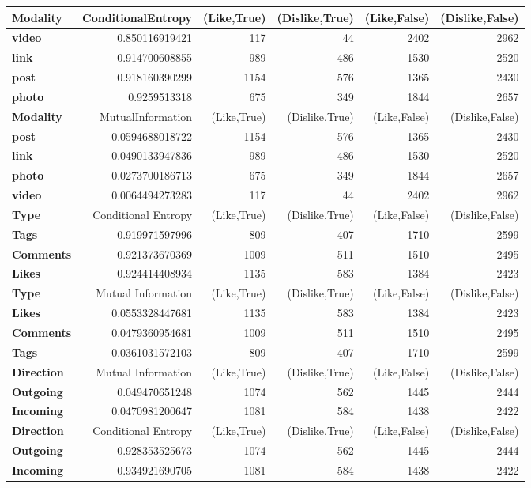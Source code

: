 \cleardoublepage
\begin{table}
	\centering
	\begin{tabular}{| >{\small}l | >{\small}r | >{\small}r | >{\small}r | >{\small}r | >{\small}r |}
		\hline
		Modality & ConditionalEntropy & (Like,True) & (Dislike,True) & (Like,False) & (Dislike,False)\\
		\hline
		\textbf{video} & 0.850116919421 & 117 & 44 & 2402 & 2962\\
		\hline
		\textbf{link} & 0.914700608855 & 989 & 486 & 1530 & 2520\\
		\hline
		\textbf{post} & 0.918160390299 & 1154 & 576 & 1365 & 2430\\
		\hline
		\textbf{photo} & 0.9259513318 & 675 & 349 & 1844 & 2657\\
		\hline
		\hline
		\textbf{Modality} & MutualInformation & (Like,True) & (Dislike,True) & (Like,False) & (Dislike,False)\\
		\hline
		\textbf{post} & 0.0594688018722 & 1154 & 576 & 1365 & 2430\\
		\hline
		\textbf{link} & 0.0490133947836 & 989 & 486 & 1530 & 2520\\
		\hline
		\textbf{photo} & 0.0273700186713 & 675 & 349 & 1844 & 2657\\
		\hline
		\textbf{video} & 0.0064494273283 & 117 & 44 & 2402 & 2962\\
		\hline
		\hline
		\textbf{Type}  & Conditional Entropy & (Like,True) & (Dislike,True) & (Like,False) & (Dislike,False)\\
		\hline
		\textbf{Tags}  &  0.919971597996 & 809 & 407 & 1710 & 2599\\
		\hline
		\textbf{Comments}  &  0.921373670369 & 1009 & 511 & 1510 & 2495\\
		\hline
		\textbf{Likes}  &  0.924414408934 & 1135 & 583 & 1384 & 2423\\
		\hline
		\textbf{Type}  & Mutual Information & (Like,True) & (Dislike,True) & (Like,False) & (Dislike,False)\\
		\hline
		\textbf{Likes}  &  0.0553328447681 & 1135 & 583 & 1384 & 2423\\
		\hline
		\textbf{Comments}  &  0.0479360954681 & 1009 & 511 & 1510 & 2495\\
		\hline
		\textbf{Tags}  &  0.0361031572103 & 809 & 407 & 1710 & 2599\\
		\hline
		\textbf{Direction} & Mutual Information & (Like,True) & (Dislike,True) & (Like,False) & (Dislike,False)\\
		\hline
		\textbf{Outgoing}  &  0.049470651248 & 1074 & 562 & 1445 & 2444\\
		\hline
		\textbf{Incoming}  &  0.0470981200647 & 1081 & 584 & 1438 & 2422\\
		\hline
		\textbf{Direction} & Conditional Entropy &  (Like,True) & (Dislike,True) & (Like,False) & (Dislike,False)\\
		\hline
		\textbf{Outgoing}  &  0.928353525673 & 1074 & 562 & 1445 & 2444\\
		\hline
		\textbf{Incoming}  &  0.934921690705 & 1081 & 584 & 1438 & 2422\\
		\hline
		

\end{tabular}
\end{table}

